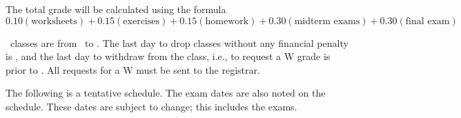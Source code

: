 \documentclass{assets/syllabus}
\begin{document}

The total grade will be calculated using the formula
\[
  0.10 (\textrm{worksheets}) +
  0.15 (\textrm{exercises}) +
  0.15 (\textrm{homework}) +
  0.30 (\textrm{midterm exams}) +
  0.30 (\textrm{final exam})
\]

\pagebreak
{}

\Semester\ classes are from \Startsemesterclasses\
to \Endsemesterclasses.  The last day to drop
classes without any financial penalty is
\Addanddrop, and the last day to withdraw from the
class, i.e., to request a {\ec W} grade is prior
to \Lastdropdate.  All requests for a W must be
sent to the registrar.

The following is a tentative schedule. The exam dates are
also noted on the schedule. These dates are subject to
change; this includes the exams.
\end{document}

